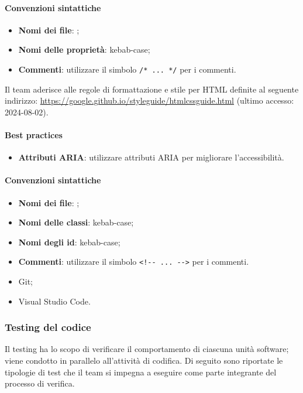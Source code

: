 \paragraph*{Convenzioni sintattiche}
\begin{itemize}
  \item \textbf{Nomi dei file}: ;
  \item \textbf{Nomi delle proprietà}: kebab-case;
  \item \textbf{Commenti}: utilizzare il simbolo \verb|/* ... */| per i commenti.
\end{itemize}

\par Il team aderisce alle regole di formattazione e stile per HTML definite al seguente indirizzo: \href{https://google.github.io/styleguide/htmlcssguide.html}{https://google.github.io/styleguide/htmlcssguide.html} (ultimo accesso: 2024-08-02).

\paragraph*{Best practices}
\begin{itemize}
  \item \textbf{Attributi ARIA}: utilizzare attributi ARIA per migliorare l'accessibilità.
\end{itemize}

\paragraph*{Convenzioni sintattiche}
\begin{itemize}
  \item \textbf{Nomi dei file}: ;
  \item \textbf{Nomi delle classi}: kebab-case;
  \item \textbf{Nomi degli id}: kebab-case;
  \item \textbf{Commenti}: utilizzare il simbolo \verb|<!-- ... -->| per i commenti.
\end{itemize}

\IntroStrumenti
\begin{itemize}
  \item Git;
  \item Visual Studio Code.
\end{itemize}

\subsubsection{Testing del codice}\label{testing-codice}
\par Il testing ha lo scopo di verificare il comportamento di ciascuna unità software; viene condotto in parallelo all'attività di codifica. Di seguito sono riportate le tipologie di test che il team si impegna a eseguire come parte integrante del processo di verifica.

